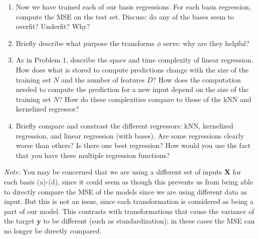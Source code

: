 \documentclass[submit]{harvardml}
\begin{document}
\begin{problem}
\begin{enumerate}
        Then, create a plot of the fitted regression line for each basis against a scatter plot of the training data. Boilerplate plotting code is provided in the notebook---you will only need to finish up a part of it. \textbf{All you need to include in your writeup for this part are these four plots.}
    
        \item Now we have trained each of our basis regressions. For each basis regression, compute the MSE on the test set. Discuss: do any of the bases seem to overfit? Underfit? Why?
    
        \item Briefly describe what purpose the transforms $\phi$ serve: why are they helpful?
    
        \item As in Problem 1, describe the space and time complexity of linear regression.  How does what is stored to compute predictions change with the size of the training set $N$ and the number of features $D$?  How does the computation needed to compute the prediction for a new input depend on the size of the training set $N$?  How do these complexities compare to those of the kNN and kernelized regressor?
    
        \item Briefly compare and constrast the different regressors: kNN, kernelized regression, and linear regression (with bases). Are some regressions clearly worse than others?  Is there one best regression?  How would you use the fact that you have these multiple regression functions?
    \end{enumerate}
      
    \noindent \textit{Note:} You may be concerned that we are using a different set of inputs $\mathbf{X}$ for each basis (a)-(d), since it could seem as though this prevents us from being able to directly compare the MSE of the models since we are using different data as input. But this is not an issue, since each transformation is considered as being a part of our model. This contrasts with transformations that cause the variance of the target $\mathbf{y}$ to be different  (such as standardization); in these cases the MSE can no longer be directly compared.
\end{problem}

\newpage
\end{document}
